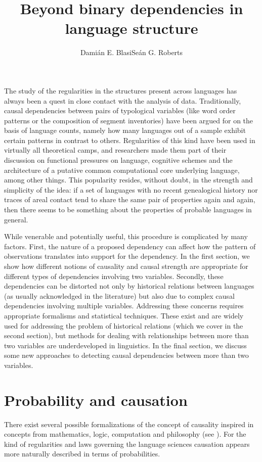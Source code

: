 \documentclass[output=paper]{langsci/langscibook}
\title{Beyond binary dependencies in language structure}
\author{Damián E. Blasi\affiliation{University of Zürich, \\Max Planck Institute for the Science of Human History}\lastand Seán G. Roberts\affiliation{Max Planck Institute for Psycholinguistics}
}
\begin{document}
\maketitle

    \noindent The study of the regularities in the structures present across languages has always been a quest in close contact with the analysis of data. Traditionally, causal dependencies between pairs of typological variables (like word order patterns or the composition of segment inventories) have been argued for on the basis of language counts, namely how many languages out of a sample exhibit certain patterns in contrast to others. Regularities of this kind have been used in virtually all theoretical camps, and researchers made them part of their discussion on functional pressures on language, cognitive schemes and the architecture of a putative common computational core underlying language, among other things. This popularity resides, without doubt, in the strength and simplicity of the idea: if a set of languages with no recent genealogical history nor traces of areal contact tend to share the same pair of properties again and again, then there seems to be something about the properties of probable languages in general. 

  While venerable and potentially useful, this procedure is complicated by many factors.  First, the nature of a proposed dependency can affect how the pattern of observations translates into support for the dependency.  In the first section, we show how different notions of causality and causal strength are appropriate for different types of dependencies involving two variables.  Secondly, these dependencies can be distorted not only by historical relations  between languages (as usually acknowledged in the literature) but also due to complex causal dependencies involving multiple variables.  Addressing these concerns requires appropriate formalisms and statistical techniques. These exist and are widely used for addressing the problem of historical relations  (which we cover in the second section), but methods for dealing with relationships between more than two variables are underdeveloped in linguistics. In the final section, we discuss some new approaches to detecting causal dependencies between more than two variables.

\section{Probability and causation}
  There exist several possible formalizations of the concept of causality inspired in concepts from mathematics, logic, computation and philosophy (see \citealt{fitelson2011probabilistic}). For the kind of regularities and laws governing the language sciences causation appears more naturally described in terms of probabilities. 
 
\end{document}
